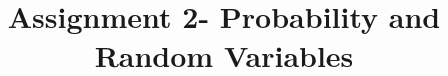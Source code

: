 \documentclass[journal,12pt,twocolumn]{IEEEtran}
\DeclareMathOperator*{\Res}{Res}
\begin{document}
\newcommand{\BEQA}{\begin{eqnarray}}
\newcommand{\EEQA}{\end{eqnarray}}
\newcommand{\define}{\stackrel{\triangle}{=}}

\raggedbottom
\setlength{\parindent}{0pt}
\providecommand{\mbf}{\mathbf}
\providecommand{\pr}[1]{\ensuremath{\Pr\left(#1\right)}}
\providecommand{\qfunc}[1]{\ensuremath{Q\left(#1\right)}}
\providecommand{\sbrak}[1]{\ensuremath{{}\left[#1\right]}}
\providecommand{\lsbrak}[1]{\ensuremath{{}\left[#1\right.}}
\providecommand{\rsbrak}[1]{\ensuremath{{}\left.#1\right]}}
\providecommand{\brak}[1]{\ensuremath{\left(#1\right)}}
\providecommand{\lbrak}[1]{\ensuremath{\left(#1\right.}}
\providecommand{\rbrak}[1]{\ensuremath{\left.#1\right)}}
\providecommand{\cbrak}[1]{\ensuremath{\left\{#1\right\}}}
\providecommand{\lcbrak}[1]{\ensuremath{\left\{#1\right.}}
\providecommand{\rcbrak}[1]{\ensuremath{\left.#1\right\}}}
\theoremstyle{remark}
\newtheorem{rem}{Remark}
\newcommand{\sgn}{\mathop{\mathrm{sgn}}}
\providecommand{\abs}[1]{\vert#1\vert}
\providecommand{\res}[1]{\Res\displaylimits_{#1}} 
\providecommand{\norm}[1]{\lVert#1\rVert}
\providecommand{\mtx}[1]{\mathbf{#1}}
\providecommand{\mean}[1]{E[ #1 ]}
\providecommand{\fourier}{\overset{\mathcal{F}}{ \rightleftharpoons}}
\providecommand{\system}{\overset{\mathcal{H}}{ \longleftrightarrow}}
\newcommand{\solution}{\noindent \textbf{Solution: }}
\newcommand{\cosec}{\,\text{cosec}\,}
\providecommand{\dec}[2]{\ensuremath{\overset{#1}{\underset{#2}{\gtrless}}}}
\newcommand{\myvec}[1]{\ensuremath{\begin{pmatrix}#1\end{pmatrix}}}
\newcommand{\mydet}[1]{\ensuremath{\begin{vmatrix}#1\end{vmatrix}}}
\makeatletter
{}
\makeatother
\let\StandardTheFigure\thefigure
\let\vec\mathbf
\renewcommand{\thefigure}{\theproblem}
\def\putbox#1#2#3{\makebox[0in][l]{\makebox[#1][l]{}\raisebox{\baselineskip}[0in][0in]{\raisebox{#2}[0in][0in]{#3}}}}
     \def\rightbox#1{\makebox[0in][r]{#1}}
     \def\centbox#1{\makebox[0in]{#1}}
     \def\topbox#1{\raisebox{-\baselineskip}[0in][0in]{#1}}
     \def\midbox#1{\raisebox{-0.5\baselineskip}[0in][0in]{#1}}
\vspace{3cm}
\title{Assignment 2- Probability and Random Variables}
\end{document}
